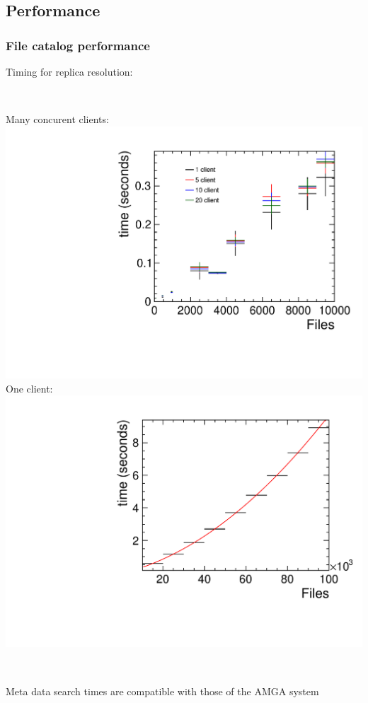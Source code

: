 \documentclass[10pt,table,dvipsnames]{beamer}
\begin{document}
\subsection{Performance}
\label{sec:prefsfc}

\begin{frame}
  \frametitle{File catalog performance}
Timing for replica resolution:\\
~\\
\begin{columns}[c]
\column{6cm}
Many concurent clients:\\
\includegraphics[width=\textwidth]{DFC_stats_lin_all}
\column{6cm}
One client:\\
\includegraphics[width=\textwidth]{t_vs_f_nc1_zoom2_pol2}
\end{columns}
~\\
Meta data search times are compatible with those of the AMGA system
\end{frame}
\end{document}
